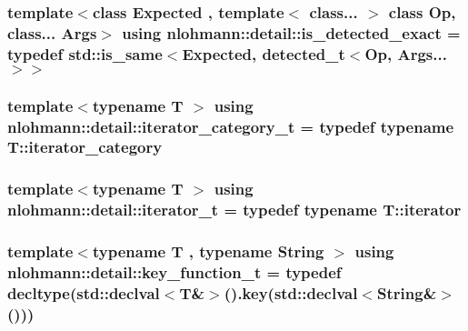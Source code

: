 \subsubsection[{\texorpdfstring{is\+\_\+detected\+\_\+exact}{is_detected_exact}}]{\setlength{\rightskip}{0pt plus 5cm}template$<$class Expected , template$<$ class... $>$ class Op, class... Args$>$ using {\bf nlohmann\+::detail\+::is\+\_\+detected\+\_\+exact} = typedef std\+::is\+\_\+same$<$Expected, {\bf detected\+\_\+t}$<$Op, Args...$>$$>$}\hypertarget{namespacenlohmann_1_1detail_aa5a24092e12003ae73ae457b0dd29abd}{}\label{namespacenlohmann_1_1detail_aa5a24092e12003ae73ae457b0dd29abd}
\subsubsection[{\texorpdfstring{iterator\+\_\+category\+\_\+t}{iterator_category_t}}]{\setlength{\rightskip}{0pt plus 5cm}template$<$typename T $>$ using {\bf nlohmann\+::detail\+::iterator\+\_\+category\+\_\+t} = typedef typename T\+::iterator\+\_\+category}\hypertarget{namespacenlohmann_1_1detail_ad22d2aa3aab018050ae519f6754366e1}{}\label{namespacenlohmann_1_1detail_ad22d2aa3aab018050ae519f6754366e1}
\subsubsection[{\texorpdfstring{iterator\+\_\+t}{iterator_t}}]{\setlength{\rightskip}{0pt plus 5cm}template$<$typename T $>$ using {\bf nlohmann\+::detail\+::iterator\+\_\+t} = typedef typename T\+::iterator}\hypertarget{namespacenlohmann_1_1detail_a9ff93db146174305bce1bc4c54703e11}{}\label{namespacenlohmann_1_1detail_a9ff93db146174305bce1bc4c54703e11}
\subsubsection[{\texorpdfstring{key\+\_\+function\+\_\+t}{key_function_t}}]{\setlength{\rightskip}{0pt plus 5cm}template$<$typename T , typename String $>$ using {\bf nlohmann\+::detail\+::key\+\_\+function\+\_\+t} = typedef decltype(std\+::declval$<$T\&$>$().key(std\+::declval$<$String\&$>$()))}\hypertarget{namespacenlohmann_1_1detail_a44869ca9f422b260625d78e4e8121559}{}\label{namespacenlohmann_1_1detail_a44869ca9f422b260625d78e4e8121559}
